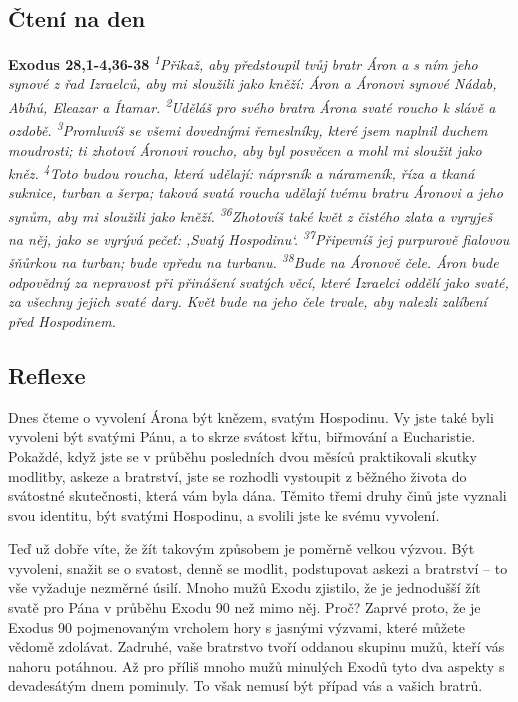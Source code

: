 \documentclass[11pt]{article}
\begin{document}
\subsection*{Čtení na den}
\textbf{Exodus 28,1-4,36-38}
\newline
\textit{
\textsuperscript{1}Přikaž, aby předstoupil tvůj bratr Áron a s ním jeho synové z řad Izraelců, aby mi sloužili jako kněží: Áron a Áronovi synové Nádab, Abíhú, Eleazar a Ítamar.
\textsuperscript{2}Uděláš pro svého bratra Árona svaté roucho k slávě a ozdobě.
\textsuperscript{3}Promluvíš se všemi dovednými řemeslníky, které jsem naplnil duchem moudrosti; ti zhotoví Áronovi roucho, aby byl posvěcen a mohl mi sloužit jako kněz.
\textsuperscript{4}Toto budou roucha, která udělají: náprsník a nárameník, říza a tkaná suknice, turban a šerpa; taková svatá roucha udělají tvému bratru Áronovi a jeho synům, aby mi sloužili jako kněží.
\newline
\newline
\textsuperscript{36}Zhotovíš také květ z čistého zlata a vyryješ na něj, jako se vyrývá pečeť: ,Svatý Hospodinu‘.
\textsuperscript{37}Připevníš jej purpurově fialovou šňůrkou na turban; bude vpředu na turbanu.
\textsuperscript{38}Bude na Áronově čele. Áron bude odpovědný za nepravost při přinášení svatých věcí, které Izraelci oddělí jako svaté, za všechny jejich svaté dary. Květ bude na jeho čele trvale, aby nalezli zalíbení před Hospodinem.
}

\subsection*{Reflexe}
Dnes čteme o vyvolení Árona být knězem, svatým Hospodinu. Vy jste také byli vyvoleni být svatými Pánu, a to skrze
svátost křtu, biřmování a Eucharistie. Pokaždé, když jste se v průběhu posledních dvou měsíců praktikovali skutky
modlitby, askeze a bratrství, jste se rozhodli vystoupit z běžného života do svátostné skutečnosti, která vám byla dána.
Těmito třemi druhy činů jste vyznali svou identitu, být svatými Hospodinu, a svolili jste ke svému vyvolení.

Teď už dobře víte, že žít takovým způsobem je poměrně velkou výzvou. Být vyvoleni, snažit se o svatost, denně se
modlit, podstupovat askezi a bratrství – to vše vyžaduje nezměrné úsilí. Mnoho mužů Exodu zjistilo, že je jednodušší
žít svatě pro Pána v průběhu Exodu 90 než mimo něj. Proč? Zaprvé proto, že je Exodus 90 pojmenovaným vrcholem
hory s jasnými výzvami, které můžete vědomě zdolávat. Zadruhé, vaše bratrstvo tvoří oddanou skupinu mužů, kteří vás
nahoru potáhnou. Až pro příliš mnoho mužů minulých Exodů tyto dva aspekty s devadesátým dnem pominuly. To však
nemusí být případ vás a vašich bratrů.
\end{document}
